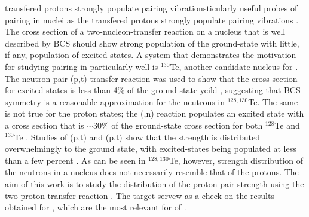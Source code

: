 transfered protons strongly populate pairing vibrationsticularly useful probes of pairing in nuclei as the transfered protons strongly populate pairing vibrations \citep{Yoshida}.  The cross section of a two-nucleon-transfer reaction on a nucleus that is well described by BCS should show strong population of the \zp ground-state with little, if any, population of \zp excited states.  A system that demonstrates the motivation for studying pairing in  particularly well is $^{130}$Te, another candidate nucleus for \zvbb.  The neutron-pair (p,t) transfer reaction was used to show that the cross section for excited \zp states is less than 4\% of the ground-state yeild \citep{neutronPairsTellurium}, suggesting that BCS symmetry is a reasonable approximation for the neutrons in $^{128,130}$Te.  The same is not true for the proton states; the (,n) reaction populates an excited \zp state with a cross section that is $\sim$30\% of the ground-state cross section for both $^{128}$Te and $^{130}$Te \citep{protonPairsTellurium}.  Studies of (p,t) and (p,t) show that the \zp strength is distributed overwhelmingly to the ground state, with excited-\zp states being populated at less than a few percent \citep{neutronPairsGermanium}.  As can be seen in $^{128,130}$Te, however, \zp strength distribution of the neutrons in a nucleus does not necessarily resemble that of the protons.  The aim of this work is to study the distribution of the proton-pair strength using the two-proton transfer reaction \reaction.  The  target servew as a check on the results obtained for , which are the most relevant for \zvbb of . 


